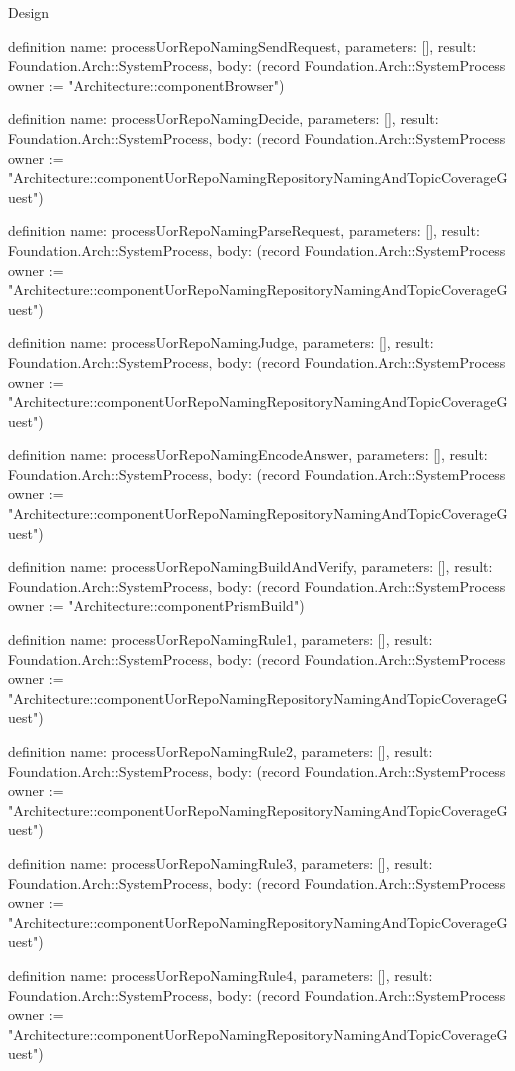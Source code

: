 \begin{lexlean}{Design}
\begin{semanticmodule}
definition{
  name: processUorRepoNamingSendRequest,
  parameters: [],
  result: Foundation.Arch::SystemProcess,
  body: (record Foundation.Arch::SystemProcess {owner := "Architecture::componentBrowser"})
}

definition{
  name: processUorRepoNamingDecide,
  parameters: [],
  result: Foundation.Arch::SystemProcess,
  body: (record Foundation.Arch::SystemProcess {owner := "Architecture::componentUorRepoNamingRepositoryNamingAndTopicCoverageGuest"})
}

definition{
  name: processUorRepoNamingParseRequest,
  parameters: [],
  result: Foundation.Arch::SystemProcess,
  body: (record Foundation.Arch::SystemProcess {owner := "Architecture::componentUorRepoNamingRepositoryNamingAndTopicCoverageGuest"})
}

definition{
  name: processUorRepoNamingJudge,
  parameters: [],
  result: Foundation.Arch::SystemProcess,
  body: (record Foundation.Arch::SystemProcess {owner := "Architecture::componentUorRepoNamingRepositoryNamingAndTopicCoverageGuest"})
}

definition{
  name: processUorRepoNamingEncodeAnswer,
  parameters: [],
  result: Foundation.Arch::SystemProcess,
  body: (record Foundation.Arch::SystemProcess {owner := "Architecture::componentUorRepoNamingRepositoryNamingAndTopicCoverageGuest"})
}

definition{
  name: processUorRepoNamingBuildAndVerify,
  parameters: [],
  result: Foundation.Arch::SystemProcess,
  body: (record Foundation.Arch::SystemProcess {owner := "Architecture::componentPrismBuild"})
}

definition{
  name: processUorRepoNamingRule1,
  parameters: [],
  result: Foundation.Arch::SystemProcess,
  body: (record Foundation.Arch::SystemProcess {owner := "Architecture::componentUorRepoNamingRepositoryNamingAndTopicCoverageGuest"})
}

definition{
  name: processUorRepoNamingRule2,
  parameters: [],
  result: Foundation.Arch::SystemProcess,
  body: (record Foundation.Arch::SystemProcess {owner := "Architecture::componentUorRepoNamingRepositoryNamingAndTopicCoverageGuest"})
}

definition{
  name: processUorRepoNamingRule3,
  parameters: [],
  result: Foundation.Arch::SystemProcess,
  body: (record Foundation.Arch::SystemProcess {owner := "Architecture::componentUorRepoNamingRepositoryNamingAndTopicCoverageGuest"})
}

definition{
  name: processUorRepoNamingRule4,
  parameters: [],
  result: Foundation.Arch::SystemProcess,
  body: (record Foundation.Arch::SystemProcess {owner := "Architecture::componentUorRepoNamingRepositoryNamingAndTopicCoverageGuest"})
}


\end{semanticmodule}
\end{lexlean}
